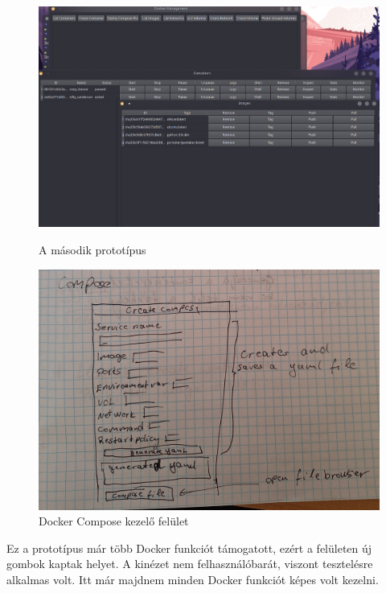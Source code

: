 \begin{figure}[H]
	\centering
	\begin{minipage}{0.45\textwidth}
		\centering
		\includegraphics[width=1\linewidth]{images/0.4}
		\caption{A második prototípus}
		\label{fig:2nd_design}
	\end{minipage}
	\hfill
	\begin{minipage}{0.45\textwidth}
		\centering
		\includegraphics[width=1\linewidth]{images/1st_compose}
		\caption{Docker Compose kezelő felület}
		\label{fig:1st_compose}
	\end{minipage}
\end{figure}




Ez a prototípus már több Docker funkciót támogatott, ezért a felületen új gombok kaptak helyet. A kinézet nem felhasználóbarát, viszont tesztelésre alkalmas volt. Itt már majdnem minden Docker funkciót képes volt kezelni. 

